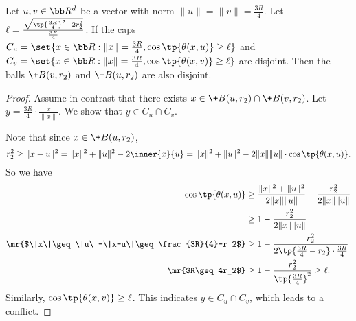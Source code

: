 \begin{lemma}\label{lem:cosinBall}
    Let $u,v\in \bb R^d$ be a vector with norm $\|u\|=\|v\|=\frac{3R}{4}$. Let $\ell=\frac{\sqrt{\tp{\frac{3R}{4}}^2-2r_2^2}}{\frac{3R}{4}}$. If the caps $C_u=\set{x\in \bb R: \|x\|=\frac{3R}{4}, \cos\tp{\theta(x,u)}\geq \ell}$ and $C_v=\set{x\in \bb R: \|x\|=\frac{3R}{4}, \cos\tp{\theta(x,v)}\geq \ell}$ are disjoint. Then the balls $\+B(v,r_2)$ and $\+B(u,r_2)$ are also disjoint.
\end{lemma}
\begin{proof}
    Assume in contrast that there exists $x\in \+B(u,r_2)\cap \+B(v,r_2)$. Let $y=\frac{3R}{4}\cdot \frac{x}{\|x\|}$. We show that $y\in C_u\cap C_v$.

    Note that since $x\in \+B(u,r_2)$, 
    \[
        r_2^2\geq \|x-u\|^2=\|x\|^2 + \|u\|^2 - 2\inner{x}{u} = \|x\|^2 + \|u\|^2 - 2\|x\|\|u\|\cdot \cos\tp{\theta(x,u)}.
    \]
    So we have
    \begin{align*}
        \cos\tp{\theta(x,u)}&\geq \frac{\|x\|^2+\|u\|^2}{2\|x\|\|u\|} - \frac{r_2^2}{2\|x\|\|u\|} \\
        &\geq 1 - \frac{r_2^2}{2\|x\|\|u\|} \\
        \mr{$\|x\|\geq \|u\|-\|x-u\|\geq \frac{3R}{4}-r_2$} &\geq 1 - \frac{r_2^2}{2\tp{\frac{3R}{4}-r_2}\cdot \frac{3R}{4}} \\
        \mr{$R\geq 4r_2$}&\geq 1-\frac{r_2^2}{\tp{\frac{3R}{4}}^2}\geq \ell.
    \end{align*}
    Similarly, $\cos\tp{\theta(x,v)}\geq \ell$. This indicates $y\in C_u\cap C_v$, which leads to a conflict.
\end{proof}


